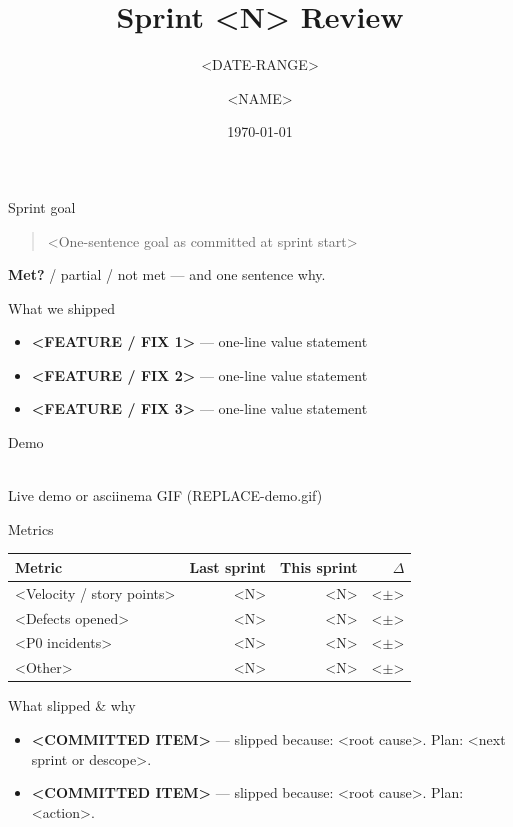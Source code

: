 \documentclass[aspectratio=169,12pt]{beamer}
\title[Sprint <N> Review]{Sprint <N> Review}
\subtitle{<DATE-RANGE>}
\author[<SHORT-NAME>]{<NAME>}
\institute[<TEAM>]{<TEAM> $\cdot$ <PRODUCT-AREA>}
\date{\today}
\begin{document}
\begin{frame}[plain]
  \titlepage
\end{frame}

\begin{frame}{Sprint goal}
  \begin{quote}
    <One-sentence goal as committed at sprint start>
  \end{quote}
  \textbf{Met?} \checkmark{} / partial / not met --- and one sentence why.
\end{frame}

\begin{frame}{What we shipped}
  \begin{itemize}
    \item \textbf{<FEATURE / FIX 1>} --- one-line value statement
    \item \textbf{<FEATURE / FIX 2>} --- one-line value statement
    \item \textbf{<FEATURE / FIX 3>} --- one-line value statement
  \end{itemize}
\end{frame}

\begin{frame}{Demo}
  \begin{center}
    \fbox{\rule{0pt}{5cm}\rule{0.85\textwidth}{0pt}}\\
    \footnotesize Live demo or asciinema GIF (REPLACE-demo.gif)
  \end{center}
\end{frame}

\begin{frame}{Metrics}
  \begin{tabular}{lrrr}
    \toprule
    Metric & Last sprint & This sprint & $\Delta$ \\
    \midrule
    <Velocity / story points> & <N> & <N> & <$\pm$> \\
    <Defects opened> & <N> & <N> & <$\pm$> \\
    <P0 incidents> & <N> & <N> & <$\pm$> \\
    <Other> & <N> & <N> & <$\pm$> \\
    \bottomrule
  \end{tabular}
\end{frame}

\begin{frame}{What slipped \& why}
  \begin{itemize}
    \item \textbf{<COMMITTED ITEM>} --- slipped because: <root cause>. Plan: <next sprint or descope>.
    \item \textbf{<COMMITTED ITEM>} --- slipped because: <root cause>. Plan: <action>.
  \end{itemize}
\end{frame}
\end{document}
